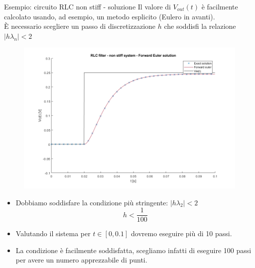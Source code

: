 \documentclass[aspectratio=169, 10pt, handout,usenames,dvipsnames]{beamer}
\begin{document}
\begin{frame}{Esempio: circuito RLC \alert{non} stiff - soluzione}
Il valore di \( V_{out}(t) \) è facilmente calcolato usando, ad esempio, un metodo esplicito (Eulero in avanti).\\ \medskip
È necessario scegliere un passo di discretizzazione $h$ che soddisfi la relazione $|h \lambda_n| < 2$\\     \bigskip    
    \begin{multicols}{2}
        \begin{figure}
       \centering        \includegraphics[width=1.05\linewidth]{rlc_non_stiff_forward_euler.png}
        \label{fig:fe_nonstiff}
        \end{figure}
    \columnbreak
    \begin{itemize}
    \item Dobbiamo soddisfare la condizione più stringente: $|h \lambda_2| < 2$
    \[
    h < \dfrac{1}{100}
    \]
    \item Valutando il sistema per $t\in [0,0.1]$ dovremo eseguire \alert{più di 10 passi}.
    \item La condizione è facilmente soddisfatta, scegliamo infatti di eseguire 100 passi per avere un numero apprezzabile di punti.
    \end{itemize}
    \end{multicols}

\end{frame}
\end{document}
